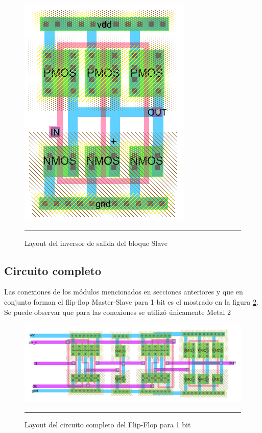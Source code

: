 \documentclass[12pt,a4paper]{article} %
\begin{document}
\begin{figure}[htbp]
  \centering
    \includegraphics[scale=0.6]{./FO4_l.png}
    \rule{35em}{0.5pt}
  \caption[FO4]{Layout del inversor de salida del bloque Slave}
  \label{fig:FO4_l}
\end{figure}

\subsection{Circuito completo}

Las conexiones de los módulos mencionados en secciones anteriores y que en conjunto forman el flip-flop Master-Slave para 1 bit es el mostrado en la figura \ref{fig:Completo}. Se puede observar que para las conexiones se utilizó únicamente Metal 2

\begin{figure}[htbp]
  \centering
    \includegraphics[scale=0.6]{./Completo.png}
    \rule{35em}{0.3pt}
  \caption[Completo]{Layout del circuito completo del Flip-Flop para 1 bit}
  \label{fig:Completo}
\end{figure}
\end{document}

